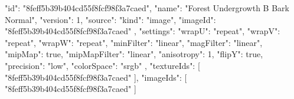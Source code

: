 {
  "id": "8feff5b39b404cd55f8fcf98f3a7caed",
  "name": "Forest Undergrowth B Bark Normal",
  "version": 1,
  "source": {
    "kind": "image",
    "imageId": "8feff5b39b404cd55f8fcf98f3a7caed"
  },
  "settings": {
    "wrapU": "repeat",
    "wrapV": "repeat",
    "wrapW": "repeat",
    "minFilter": "linear",
    "magFilter": "linear",
    "mipMap": true,
    "mipMapFilter": "linear",
    "anisotropy": 1,
    "flipY": true,
    "precision": "low",
    "colorSpace": "srgb"
  },
  "textureIds": [
    "8feff5b39b404cd55f8fcf98f3a7caed"
  ],
  "imageIds": [
    "8feff5b39b404cd55f8fcf98f3a7caed"
  ]
}
